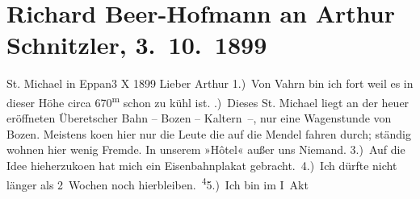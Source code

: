 

         
         \renewcommand{\erwaehntePersonen}{Personen: Otto Brahm}
         \renewcommand{\erwaehnteInstitutionen}{Institutionen: Überetscher Bahn}
         \renewcommand{\erwaehnteOrte}{Orte: Bozen, Caldaro sulla strada del vino, Eppaner Hof, Mendelpass, Sankt Michael, Vahrn}
         \renewcommand{\erwaehnteWerke}{Werke: Der Graf von Charolais. Ein Trauerspiel}
               \section[Richard Beer-Hofmann an Arthur Schnitzler, 3. 10. 1899]{ Richard Beer-Hofmann an Arthur Schnitzler, 3. 10. 1899}\nopagebreak{}\rehead{ }\begin{ledgroupsized}[t]{13cm}\normalsize\beginnumbering \toendnotes[C]{\smallbreak\pagebreak[2]} 
\toendnotes[C]{\smallbreak}\pstart
           \raggedleft{}{\pb}St. Michael in Eppan3 X 1899\pend
           \pstart
           Lieber Arthur 1.) Von Vahrn bin
               ich fort weil es in dieser Höhe circa 670\textsuperscript{m} schon zu kühl
               ist.\pend
           .) Dieses St. Michael liegt an der heuer
               eröffneten Überetscher Bahn – Bozen – Kaltern –, nur
               eine Wagenstunde von Bozen. Meistens ko{\geminationm}en hier nur die Leute die auf die Mendel fahren durch; ständig wohnen hier wenig Fremde. In
               unserem »Hôtel« außer uns Niemand. 3.) Auf die
               Idee hieherzuko{\geminationm}en hat mich ein Eisenbahnplakat
               gebracht. 4.) Ich dürfte nicht länger als 2 Wochen noch hierbleiben. \substVorne{}\textsuperscript{4}\substDazwischen{}5\substHinten{}.) Ich bin im I Akt

\end{ledgroupsized}
